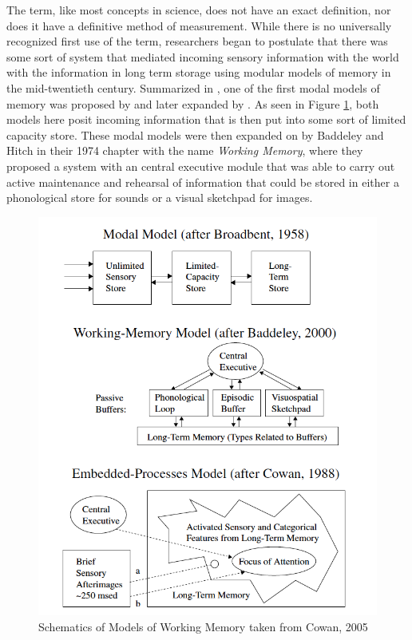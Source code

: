 \documentclass[]{book}
\begin{document}
The term, like most concepts in science, does not have an exact definition, nor does it have a definitive method of measurement.
While there is no universally recognized first use of the term, researchers began to postulate that there was some sort of system that mediated incoming sensory information with the world with the information in long term storage using modular models of memory in the mid-twentieth century.
Summarized in \citep{cowanWorkingMemoryCapacity2005}, one of the first modal models of memory was proposed by \citep{broadbentPerceptionCommunication1958} and later expanded by \citep{atkinsonHUMANMEMORYPROPOSED1968}.
As seen in Figure \ref{fig:wmmodels}, both models here posit incoming information that is then put into some sort of limited capacity store.
These modal models were then expanded on by Baddeley and Hitch \citep{baddeleyWorkingMemory1974} in their 1974 chapter with the name \emph{Working Memory}, where they proposed a system with an central executive module that was able to carry out active maintenance and rehearsal of information that could be stored in either a phonological store for sounds or a visual sketchpad for images.

\begin{figure}

{\centering \includegraphics[width=9.81in]{img/wm_models} 

}

\caption{Schematics of Models of Working Memory taken from Cowan, 2005}\label{fig:wmmodels}
\end{figure}
\end{document}
